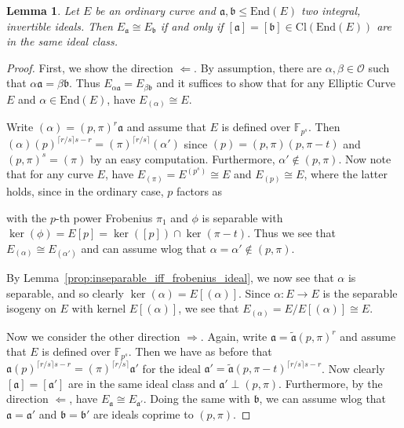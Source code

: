 \documentclass{ociamthesis}
\newcommand{\F}{\mathbb{F}}
\newcommand{\End}{\mathrm{End}}
\newcommand{\Cl}{\mathrm{Cl}}
\renewcommand{\a}{\mathfrak{a}}
\renewcommand{\b}{\mathfrak{b}}
\renewcommand{\O}{\mathcal{O}}
\newtheorem{lemma}[prop]{Lemma}
\theoremstyle{definition}
\begin{document}
\begin{lemma}
    Let $E$ be an ordinary curve and $\a, \b \leq \End(E)$ two integral, invertible ideals.
    Then $E_\a \cong E_\b$ if and only if $[\a] = [\b] \in \Cl(\End(E))$ are in the same ideal class.
\end{lemma}
\begin{proof}
    First, we show the direction $\Leftarrow$.
    By assumption, there are $\alpha, \beta \in \O$ such that $\alpha\a = \beta\b$.
    Thus $E_{\alpha\a} = E_{\beta\b}$ and it suffices to show that for any Elliptic Curve $E$ and $\alpha \in \End(E)$, have $E_{(\alpha)} \cong E$.

    Write $(\alpha) = (p, \pi)^r \a$ and assume that $E$ is defined over $\F_{p^s}$.
    Then $(\alpha)(p)^{\lceil r/s \rceil s - r} = (\pi)^{\lceil r/s \rceil}(\alpha')$ since $(p) = (p, \pi)(p, \pi - t)$ and $(p, \pi)^s = (\pi)$ by an easy computation.
    Furthermore, $\alpha' \notin (p, \pi)$.
    Now note that for any curve $E$, have $E_{(\pi)} = E^{(p^s)} \cong E$ and $E_{(p)} \cong E$, where the latter holds, since in the ordinary case, $p$ factors as
    \begin{center}
    \end{center}
    with the $p$-th power Frobenius $\pi_1$ and $\phi$ is separable with $\ker(\phi) = E[p] = \ker([p]) \cap \ker(\pi - t)$.
    Thus we see that $E_{(\alpha)} \cong E_{(\alpha')}$ and can assume wlog that $\alpha = \alpha' \notin (p, \pi)$.

    By Lemma~\ref{prop:inseparable_iff_frobenius_ideal}, we now see that $\alpha$ is separable, and so clearly $\ker(\alpha) = E[(\alpha)]$.
    Since $\alpha: E \to E$ is the separable isogeny on $E$ with kernel $E[(\alpha)]$, we see that $E_{(\alpha)} = E/E[(\alpha)] \cong E$.

    Now we consider the other direction $\Rightarrow$.
    Again, write $\a = \tilde{\a}(p, \pi)^r$ and assume that $E$ is defined over $\F_{p^s}$.
    Then we have as before that $\a (p)^{\lceil r/s \rceil s - r} = (\pi)^{\lceil r/s \rceil} \a'$ for the ideal $\a' = \tilde{\a} (p, \pi - t)^{\lceil r/s \rceil s - r}$.
    Now clearly $[\a] = [\a']$ are in the same ideal class and $\a' \perp (p, \pi)$.
    Furthermore, by the direction $\Leftarrow$, have $E_\a \cong E_{\a'}$.
    Doing the same with $\b$, we can assume wlog that $\a = \a'$ and $\b = \b'$ are ideals coprime to $(p, \pi)$.


\end{proof}
\end{document}
